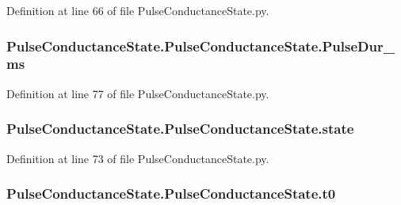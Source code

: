 Definition at line 66 of file Pulse\-Conductance\-State.\-py.

\hypertarget{class_pulse_conductance_state_1_1_pulse_conductance_state_afda03b180fc3cb619de615632e725a6f}{
\subsubsection[{Pulse\-Dur\-\_\-ms}]{\setlength{\rightskip}{0pt plus 5cm}Pulse\-Conductance\-State.\-Pulse\-Conductance\-State.\-Pulse\-Dur\-\_\-ms}}\label{class_pulse_conductance_state_1_1_pulse_conductance_state_afda03b180fc3cb619de615632e725a6f}


Definition at line 77 of file Pulse\-Conductance\-State.\-py.

\hypertarget{class_pulse_conductance_state_1_1_pulse_conductance_state_ac85aa714a187088e1b31fa2369ed4bca}{
\subsubsection[{state}]{\setlength{\rightskip}{0pt plus 5cm}Pulse\-Conductance\-State.\-Pulse\-Conductance\-State.\-state}}\label{class_pulse_conductance_state_1_1_pulse_conductance_state_ac85aa714a187088e1b31fa2369ed4bca}


Definition at line 73 of file Pulse\-Conductance\-State.\-py.

\hypertarget{class_pulse_conductance_state_1_1_pulse_conductance_state_a55f44caf230fc3899811924118705f56}{
\subsubsection[{t0}]{\setlength{\rightskip}{0pt plus 5cm}Pulse\-Conductance\-State.\-Pulse\-Conductance\-State.\-t0}}\label{class_pulse_conductance_state_1_1_pulse_conductance_state_a55f44caf230fc3899811924118705f56}


